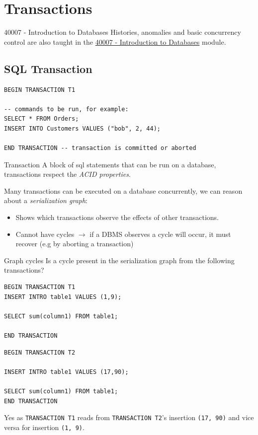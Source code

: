 \chapter{Transactions}

\begin{sidenotebox}{40007 - Introduction to Databases}
    Histories, anomalies and basic concurrency control are also taught in the \href{https://www.doc.ic.ac.uk/~pjm/idb/}{40007 - Introduction to Databases} module.
\end{sidenotebox}
\section{SQL Transaction}
\begin{verbatim}
BEGIN TRANSACTION T1

-- commands to be run, for example:
SELECT * FROM Orders;
INSERT INTO Customers VALUES ("bob", 2, 44);

END TRANSACTION -- transaction is committed or aborted
\end{verbatim}
\begin{definitionbox}{Transaction}
    A block of sql statements that can be run on a database, transactions respect the \textit{ACID properties}.
\end{definitionbox}

Many transactions can be executed on a database concurrently, we can reason about a \textit{serialization graph}:
\begin{itemize}
    \item Shows which transactions observe the effects of other transactions.
    \item Cannot have cycles $\to$ if a DBMS observes a cycle will occur, it must recover (e.g by aborting a transaction)
\end{itemize}

\begin{examplebox}{Graph cycles}
    Is a cycle present in the serialization graph from the following transactions?
    \\ \begin{minipage}[t]{.49\textwidth}
        \begin{verbatim}
BEGIN TRANSACTION T1
INSERT INTRO table1 VALUES (1,9);

SELECT sum(column1) FROM table1;

END TRANSACTION
        \end{verbatim}
    \end{minipage} \hfill \begin{minipage}[t]{.49\textwidth}
        \begin{verbatim}
BEGIN TRANSACTION T2

INSERT INTRO table1 VALUES (17,90);

SELECT sum(column1) FROM table1;
END TRANSACTION
        \end{verbatim}
    \end{minipage}
    \tcblower
    Yes as \texttt{TRANSACTION T1} reads from \texttt{TRANSACTION T2}'s insertion \texttt{(17, 90)} and vice versa for insertion \texttt{(1, 9)}.
\end{examplebox}

